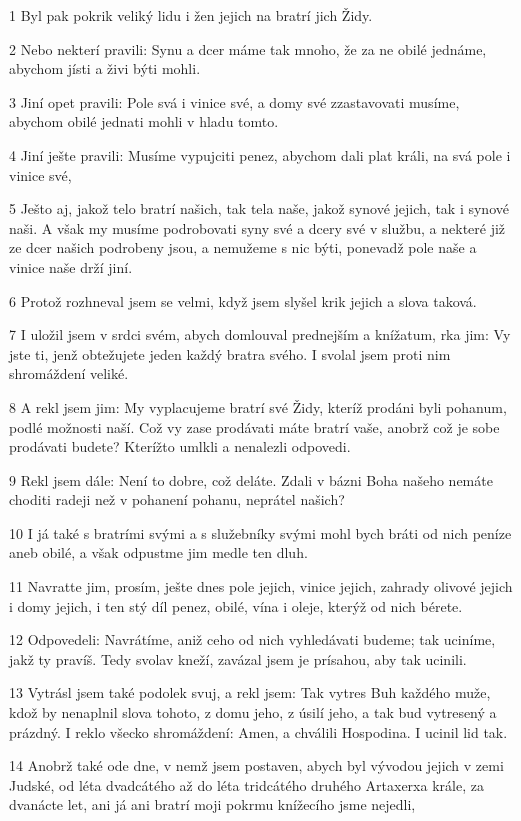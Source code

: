 \par 1 Byl pak pokrik veliký lidu i žen jejich na bratrí jich Židy.
\par 2 Nebo nekterí pravili: Synu a dcer máme tak mnoho, že za ne obilé jednáme, abychom jísti a živi býti mohli.
\par 3 Jiní opet pravili: Pole svá i vinice své, a domy své zzastavovati musíme, abychom obilé jednati mohli v hladu tomto.
\par 4 Jiní ješte pravili: Musíme vypujciti penez, abychom dali plat králi, na svá pole i vinice své,
\par 5 Ješto aj, jakož telo bratrí našich, tak tela naše, jakož synové jejich, tak i synové naši. A však my musíme podrobovati syny své a dcery své v službu, a nekteré již ze dcer našich podrobeny jsou, a nemužeme s nic býti, ponevadž pole naše a vinice naše drží jiní.
\par 6 Protož rozhneval jsem se velmi, když jsem slyšel krik jejich a slova taková.
\par 7 I uložil jsem v srdci svém, abych domlouval prednejším a knížatum, rka jim: Vy jste ti, jenž obtežujete jeden každý bratra svého. I svolal jsem proti nim shromáždení veliké.
\par 8 A rekl jsem jim: My vyplacujeme bratrí své Židy, kteríž prodáni byli pohanum, podlé možnosti naší. Což vy zase prodávati máte bratrí vaše, anobrž což je sobe prodávati budete? Kterížto umlkli a nenalezli odpovedi.
\par 9 Rekl jsem dále: Není to dobre, což deláte. Zdali v bázni Boha našeho nemáte choditi radeji než v pohanení pohanu, neprátel našich?
\par 10 I já také s bratrími svými a s služebníky svými mohl bych bráti od nich peníze aneb obilé, a však odpustme jim medle ten dluh.
\par 11 Navratte jim, prosím, ješte dnes pole jejich, vinice jejich, zahrady olivové jejich i domy jejich, i ten stý díl penez, obilé, vína i oleje, kterýž od nich bérete.
\par 12 Odpovedeli: Navrátíme, aniž ceho od nich vyhledávati budeme; tak uciníme, jakž ty pravíš. Tedy svolav kneží, zavázal jsem je prísahou, aby tak ucinili.
\par 13 Vytrásl jsem také podolek svuj, a rekl jsem: Tak vytres Buh každého muže, kdož by nenaplnil slova tohoto, z domu jeho, z úsilí jeho, a tak bud vytresený a prázdný. I reklo všecko shromáždení: Amen, a chválili Hospodina. I ucinil lid tak.
\par 14 Anobrž také ode dne, v nemž jsem postaven, abych byl vývodou jejich v zemi Judské, od léta dvadcátého až do léta tridcátého druhého Artaxerxa krále, za dvanácte let, ani já ani bratrí moji pokrmu knížecího jsme nejedli,
